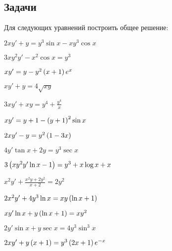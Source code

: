 \subsection{Задачи}
	
	Для следующих уравнений построить общее решение:
	\begin{multicols}{2}
		\begin{enumtasks}

			\item \( 2xy' + y = y^3\sin{x} - xy^3 \cos{x} \)															%
			\item \( 3xy^2 y' - x^2 \cos{x} = y^3 \)																	%
			\item \( xy' = y - y^2 \left( x + 1 \right) e^{x} \)																%
			\item \( xy' + y = 4 \sqrt{xy} \)																			%
			\item \( 3xy' + xy = y^4 + \frac{y^4}{x} \)																	%
			\item \( xy' = y + 1 - \left( y + 1 \right)^2 \sin{x} \)															%
			\item \( 2xy' - y = y^2 \left( 1 - 3x \right) \)																	%
			\item \( 4y' \tan{x} + 2y = y^3 \sec{x} \)																	%
			\item \( 3 \left( xy^2 y' \ln{x} - 1 \right) = y^3 + x \log{x} + x \)												%
			\item \( x^2 y' + \frac{x^2y + 2y^2}{x + 2} = 2y^2 \)														%
			\item \( 2x^2 y' + 4y^3 \ln{x} = xy \left( \ln{x} + 1 \right) \)													%
			\item \( xy' \ln{x} + y \left( \ln{x} + 1 \right) = xy^2 \)														%
			\item \( 2y' \sin{x} + y \sec{x} = 4y^3 \sin^3{x} \)														%
			\item \( 2xy' + y \left( x + 1 \right) = y^3 \left( 2x + 1 \right) e^{-x} \)												%
			
		\end{enumtasks}
	\end{multicols}

